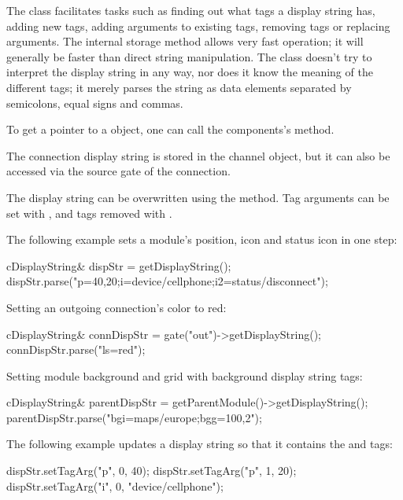 The class facilitates tasks such as finding out what tags a display string
has, adding new tags, adding arguments to existing tags, removing tags or
replacing arguments. The internal storage method allows very fast
operation; it will generally be faster than direct string manipulation. The
class doesn't try to interpret the display string in any way, nor does it
know the meaning of the different tags; it merely parses the string as data
elements separated by semicolons, equal signs and commas.

To get a pointer to a  object, one can call
the components's  method.

\begin{note}
The connection display string is stored in the channel object, but it
can also be accessed via the source gate of the connection.
\end{note}

The display string can be overwritten using the  method.
Tag arguments can be set with , and tags removed
with .

The following example sets a module's position, icon and status icon
in one step:

\begin{cpp}
cDisplayString& dispStr = getDisplayString();
dispStr.parse("p=40,20;i=device/cellphone;i2=status/disconnect");
\end{cpp}

Setting an outgoing connection's color to red:

\begin{cpp}
cDisplayString& connDispStr = gate("out")->getDisplayString();
connDispStr.parse("ls=red");
\end{cpp}

Setting module background and grid with background display string tags:

\begin{cpp}
cDisplayString& parentDispStr = getParentModule()->getDisplayString();
parentDispStr.parse("bgi=maps/europe;bgg=100,2");
\end{cpp}

The following example updates a display string so that it contains
the  and  tags:

\begin{cpp}
dispStr.setTagArg("p", 0, 40);
dispStr.setTagArg("p", 1, 20);
dispStr.setTagArg("i", 0, "device/cellphone");
\end{cpp}

